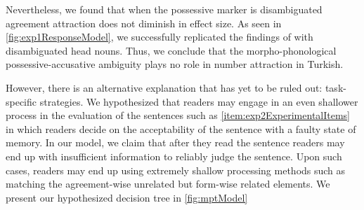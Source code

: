 \documentclass[doc,a4paper,man,natbib,floatsintext,noextraspace]{apa6}\usepackage[]{graphicx}\usepackage[]{color}
\begin{document}
Nevertheless, we found that when the possessive marker is disambiguated agreement attraction does not diminish in effect size. As seen in \autoref{fig:exp1ResponseModel}, we successfully replicated the findings of \citet{LagoEtAl:2018} with disambiguated head nouns. Thus, we conclude that the morpho-phonological possessive-accusative ambiguity plays no role in number attraction in Turkish.


However, there is an alternative explanation that has yet to be ruled out: task-specific strategies. We hypothesized that readers may engage in an even shallower process in the evaluation of the sentences such as \ref{item:exp2ExperimentalItems} in which readers decide on the acceptability of the sentence with a faulty state of memory. In our model, we claim that after they read the sentence readers may end up with insufficient information to reliably judge the sentence. Upon such cases, readers may end up using extremely shallow processing methods such as matching the agreement-wise unrelated but form-wise related elements. %
We present our hypothesized decision tree in \autoref{fig:mptModel}
\end{document}
